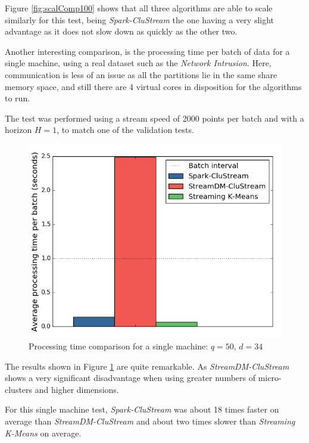 \documentclass[10pt, conference, compsocconf]{IEEEtran}
\begin{document}
Figure \ref{fig:scalComp100} shows that all three algorithms are able to scale similarly for this test, being \textit{Spark-CluStream} the one having a very slight advantage as it does not slow down as quickly as the other two.



Another interesting comparison, is the processing time per batch of data for a single machine, using a real dataset such as the \textit{Network Intrusion}. Here, communication is less of an issue as all the partitions lie in the same share memory space, and still there are 4 virtual cores in disposition for the algorithms to run. 

The test was performed using a stream speed of 2000 points per batch and with a horizon $H=1$, to match one of the validation tests.

\begin{figure}[h!]
 \centering
 \includegraphics[scale=0.47]{./styles/singlemachine.png}
 \caption{Processing time comparison for a single machine: $q=50$, $d=34$}
 \label{fig:singlemachine}
\end{figure}

The results shown in Figure \ref{fig:singlemachine} are quite remarkable. As \textit{StreamDM-CluStream} shows a very significant disadvantage when using greater numbers of micro-clusters and higher dimensions.

For this single machine test, \textit{Spark-CluStream} was about 18 times faster on average than \textit{StreamDM-CluStream} and about two times slower than \textit{Streaming K-Means} on average.
\end{document}
